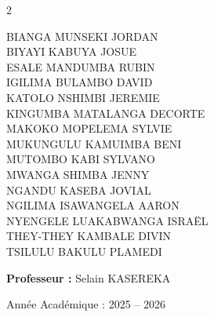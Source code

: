 \begin{titlepage}
\begin{center}
        \begin{multicols}{2}
            \begin{flushleft} \small
                BIANGA MUNSEKI JORDAN\\
				BIYAYI KABUYA JOSUE\\
				ESALE MANDUMBA RUBIN\\
				IGILIMA BULAMBO DAVID\\
				KATOLO NSHIMBI JEREMIE\\
				KINGUMBA MATALANGA DECORTE\\
				MAKOKO MOPELEMA SYLVIE\\
				MUKUNGULU KAMUIMBA BENI\\
				MUTOMBO KABI SYLVANO\\
				MWANGA SHIMBA JENNY\\
				NGANDU KASEBA JOVIAL\\
				NGILIMA ISAWANGELA AARON\\
				NYENGELE LUAKABWANGA ISRAËL\\
				THEY-THEY KAMBALE DIVIN\\
				TSILULU BAKULU PLAMEDI\\
            \end{flushleft}
        \end{multicols}

        \vspace{0.8cm}

        \begin{flushright} \small
            \textbf{Professeur :} Selain KASEREKA \\
        \end{flushright}
        
        \vfill
        
        {\large Année Académique : 2025 -- 2026}
    \end{center}
\end{titlepage}
